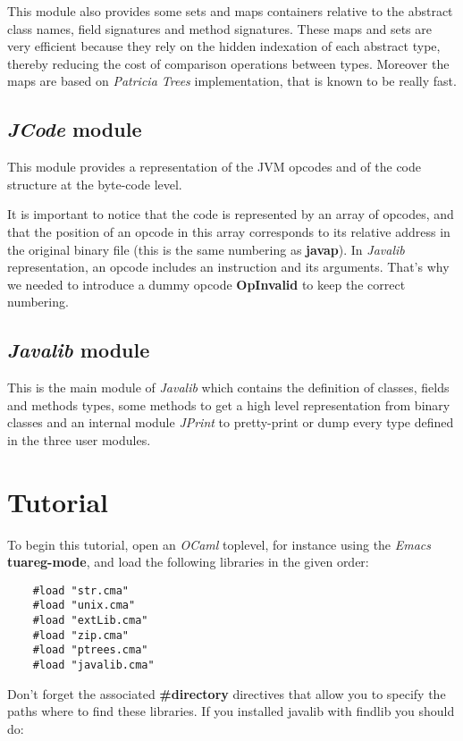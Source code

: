 \documentclass{article}
\begin{document}
This module also provides some sets and maps containers relative to
the abstract class names, field signatures and method signatures.
These maps and sets are very efficient because they rely on the
hidden indexation of each abstract type, thereby reducing the cost
of comparison operations between types. Moreover the maps are based
on \emph{Patricia Trees} implementation, that is known to be really
fast.

\subsection{\emph{JCode} module}

This module provides a representation of the JVM opcodes and of the
code structure at the byte-code level.

It is important to notice that the code is represented by an array
of opcodes, and that the position of an opcode in this array
corresponds to its relative address in the original binary file
(this is the same numbering as \textbf{javap}). In \emph{Javalib}
representation, an opcode includes an instruction and its
arguments. That's why we needed to introduce a dummy opcode
\textbf{OpInvalid} to keep the correct numbering.

\subsection{\emph{Javalib} module}

This is the main module of \emph{Javalib} which contains the
definition of classes, fields and methods types, some methods to
get a high level representation from binary classes and an internal
module \emph{JPrint} to pretty-print or dump every type defined in
the three user modules.

\section{Tutorial}

To begin this tutorial, open an \emph{OCaml} toplevel, for instance
using the \emph{Emacs} \textbf{tuareg-mode}, and load the following
libraries in the given order:

\begin{verbatim}
    #load "str.cma"
    #load "unix.cma"
    #load "extLib.cma"
    #load "zip.cma"
    #load "ptrees.cma"
    #load "javalib.cma"
\end{verbatim}
Don't forget the associated \textbf{\#directory} directives that
allow you to specify the paths where to find these libraries. If
you installed javalib with findlib you should do:
\end{document}

